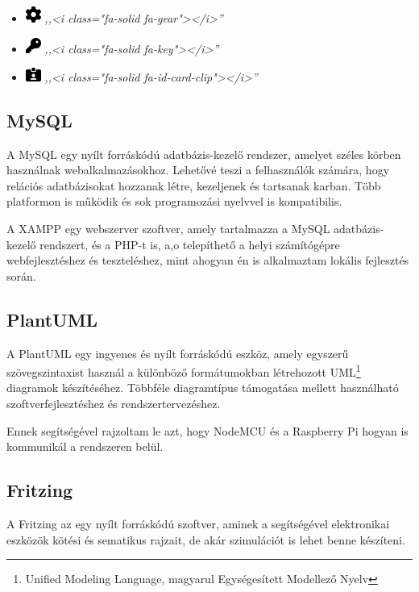\documentclass[
]{thesis-ekf}
\theoremstyle{definition}
\theoremstyle{remark}
\begin{document}
\begin{itemize}
		\item \includegraphics[width=0.5cm]{./src/icons/gear-solid}
			\emph{,,<i class="fa-solid fa-gear"></i>''}
			
		\item \includegraphics[width=0.5cm]{./src/icons/key-solid}
			\emph{,,<i class="fa-solid fa-key"></i>''}
			
		\item \includegraphics[width=0.5cm]{./src/icons/id-card-clip-solid}
			\emph{,,<i class="fa-solid fa-id-card-clip"></i>''}
			
	\end{itemize}
	\subsection{MySQL}
	A MySQL egy nyílt forráskódú adatbázis-kezelő rendszer, amelyet széles körben használnak webalkalmazásokhoz. Lehetővé teszi a felhasználók számára, hogy relációs adatbázisokat hozzanak létre, kezeljenek és tartsanak karban. Több platformon is működik és sok programozási nyelvvel is kompatibilis.
	
	A XAMPP egy webszerver szoftver, amely tartalmazza a MySQL adatbázis-kezelő rendszert, és a PHP-t is, a,o telepíthető a helyi számítógépre webfejlesztéshez és teszteléshez, mint ahogyan én is alkalmaztam lokális fejlesztés során.
	\subsection{PlantUML}
	A PlantUML egy ingyenes és nyílt forráskódú eszköz, amely egyszerű szövegszintaxist használ a különböző formátumokban létrehozott UML\footnote{Unified Modeling Language, magyarul Egységesített Modellező Nyelv} diagramok készítéséhez. Többféle diagramtípus támogatása mellett használható szoftverfejlesztéshez és rendszertervezéshez.

	Ennek segítségével rajzoltam le azt, hogy NodeMCU és a Raspberry Pi hogyan is kommunikál a rendszeren belül.
	\subsection{Fritzing}
	A Fritzing az egy nyílt forráskódú szoftver, aminek a segítségével elektronikai eszközök kötési és sematikus rajzait, de akár szimulációt is lehet benne készíteni.
	
\end{document}
